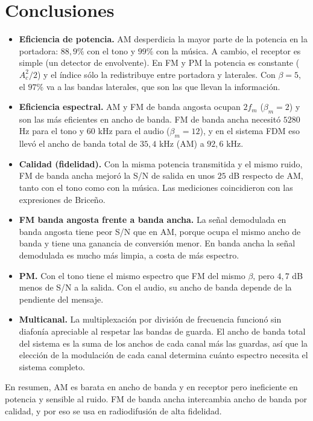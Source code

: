 \documentclass[11pt,a4paper]{article}
\numberwithin{equation}{section}
\begin{document}
\section{Conclusiones}
\begin{itemize}
  \item \textbf{Eficiencia de potencia.} AM desperdicia la mayor parte de la potencia en la portadora: $88,9\%$ con el tono y $99\%$ con la música. A cambio, el receptor es simple (un detector de envolvente). En FM y PM la potencia es constante ($A_c^2/2$) y el índice sólo la redistribuye entre portadora y laterales. Con $\beta=5$, el $97\%$ va a las bandas laterales, que son las que llevan la información.
  \item \textbf{Eficiencia espectral.} AM y FM de banda angosta ocupan $2f_m$ ($\beta_m=2$) y son las más eficientes en ancho de banda. FM de banda ancha necesitó $5280$ Hz para el tono y $60$ kHz para el audio ($\beta_m=12$), y en el sistema FDM eso llevó el ancho de banda total de $35,4$ kHz (AM) a $92,6$ kHz.
  \item \textbf{Calidad (fidelidad).} Con la misma potencia transmitida y el mismo ruido, FM de banda ancha mejoró la S/N de salida en unos $25$ dB respecto de AM, tanto con el tono como con la música. Las mediciones coincidieron con las expresiones de Briceño.
  \item \textbf{FM banda angosta frente a banda ancha.} La señal demodulada en banda angosta tiene peor S/N que en AM, porque ocupa el mismo ancho de banda y tiene una ganancia de conversión menor. En banda ancha la señal demodulada es mucho más limpia, a costa de más espectro.
  \item \textbf{PM.} Con el tono tiene el mismo espectro que FM del mismo $\beta$, pero $4,7$ dB menos de S/N a la salida. Con el audio, su ancho de banda depende de la pendiente del mensaje.
  \item \textbf{Multicanal.} La multiplexación por división de frecuencia funcionó sin diafonía apreciable al respetar las bandas de guarda. El ancho de banda total del sistema es la suma de los anchos de cada canal más las guardas, así que la elección de la modulación de cada canal determina cuánto espectro necesita el sistema completo.
\end{itemize}
En resumen, AM es barata en ancho de banda y en receptor pero ineficiente en potencia y sensible al ruido. FM de banda ancha intercambia ancho de banda por calidad, y por eso se usa en radiodifusión de alta fidelidad.

\appendix
\end{document}
